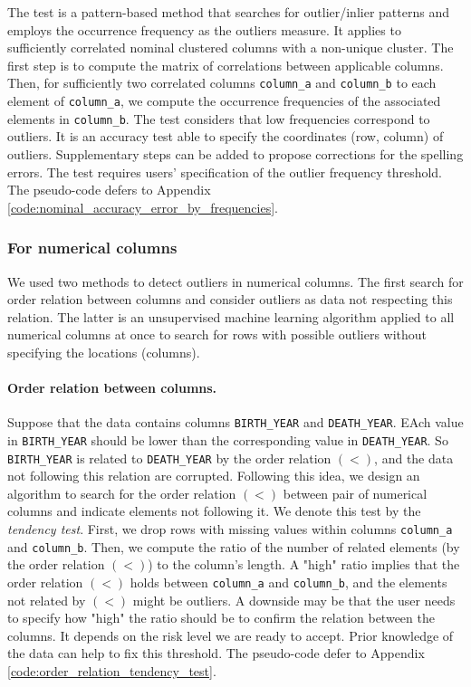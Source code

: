 \documentclass{article}
\begin{document}
The test is a pattern-based method that searches for outlier/inlier patterns and employs the occurrence frequency as the outliers measure.
It applies to sufficiently correlated nominal clustered columns with a non-unique cluster.
The first step is to compute the matrix of correlations between applicable columns.
Then, for sufficiently two correlated columns \texttt{column\_a} and \texttt{column\_b} to each element of \texttt{column\_a}, we compute the occurrence frequencies of the associated elements in \texttt{column\_b}.
The test considers that low frequencies correspond to outliers.
It is an accuracy test able to specify the coordinates (row, column) of outliers.
Supplementary steps can be added to propose corrections for the spelling errors.
The test requires users’ specification of the outlier frequency threshold.
The pseudo-code defers to Appendix \ref{code:nominal_accuracy_error_by_frequencies}.

\subsubsection{For numerical columns} %
\label{ssub:For numerical columns}
We used two methods to detect outliers in numerical columns.
The first search for order relation between columns and consider outliers as data not respecting this relation.
The latter is an unsupervised machine learning algorithm applied to all numerical columns at once to search for rows with possible outliers without specifying the locations (columns).

\paragraph{Order relation between columns.} %
\label{sub:Logical order relation}
Suppose that the data contains columns \texttt{BIRTH\_YEAR} and \texttt{DEATH\_YEAR}.
EAch value in \texttt{BIRTH\_YEAR} should be lower than the corresponding value in \texttt{DEATH\_YEAR}.
So \texttt{BIRTH\_YEAR} is related to \texttt{DEATH\_YEAR} by the order relation $(<)$, and the data not following this relation are corrupted.
Following this idea, we design an algorithm to search for the order relation $(<)$ between pair of numerical columns and indicate elements not following it.
We denote this test by the \textit{tendency test}.
First, we drop rows with missing values within columns \texttt{column\_a} and \texttt{column\_b}.
Then, we compute the ratio of the number of related elements (by the order relation $(<)$) to the column's length.
A "high" ratio implies that the order relation $(<)$ holds between \texttt{column\_a} and \texttt{column\_b}, and the elements not related by $(<)$ might be outliers.
A downside may be that the user needs to specify how "high" the ratio should be to confirm the relation between the columns.
It depends on the risk level we are ready to accept.
Prior knowledge of the data can help to fix this threshold.
The pseudo-code defer to Appendix \ref{code:order_relation_tendency_test}.
\end{document}
